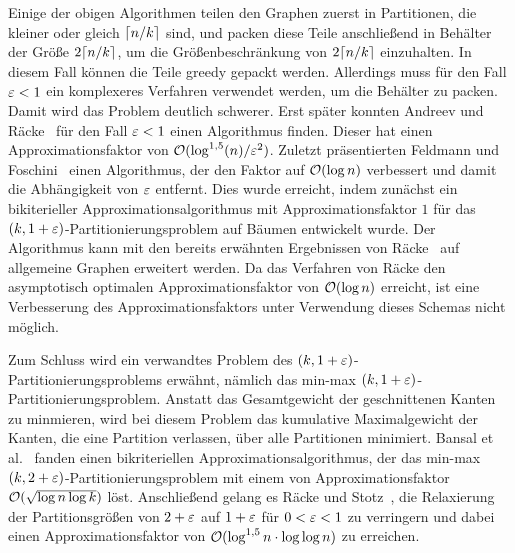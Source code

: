 Einige der obigen Algorithmen teilen den Graphen zuerst in Partitionen, die kleiner oder gleich $\lceil n/k\rceil$ sind, und packen diese Teile anschließend in Behälter der Größe $2 \lceil n/k\rceil$, um die Größenbeschränkung von $2 \lceil n/k\rceil$ einzuhalten.
In diesem Fall können die Teile greedy gepackt werden.
Allerdings muss für den Fall $\varepsilon < 1$ ein komplexeres Verfahren verwendet werden, um die Behälter zu packen. 
Damit wird das Problem deutlich schwerer.
Erst später konnten Andreev und Räcke~\cite{ar06} für den Fall $\varepsilon < 1$ einen Algorithmus finden.
Dieser hat einen Approximationsfaktor von $\mathcal{O}(\log^{1,5}(n)/\varepsilon^2)$.
Zuletzt präsentierten Feldmann und Foschini~\cite{FF15} einen Algorithmus, der den Faktor auf $\mathcal{O}(\log n)$ verbessert und damit die Abhängigkeit von $\varepsilon$ entfernt.
Dies wurde erreicht, indem zunächst ein bikiterieller Approximationsalgorithmus mit Approximationsfaktor $1$ für das $(k,1+\varepsilon)$\hyp Partitionierungsproblem auf Bäumen entwickelt wurde.
Der Algorithmus kann mit den bereits erwähnten Ergebnissen von Räcke~\cite{rc08} auf allgemeine Graphen erweitert werden.
Da das Verfahren von Räcke den asymptotisch optimalen Approximationsfaktor von $\mathcal{O}(\log n)$ erreicht, ist eine Verbesserung des Approximationsfaktors unter Verwendung dieses Schemas nicht möglich.

Zum Schluss wird ein verwandtes Problem des $(k, 1+\varepsilon)$\hyp Partitionierungsproblems erwähnt, nämlich das min-max $(k, 1+\varepsilon)$\hyp Partitionierungsproblem.
Anstatt das Gesamtgewicht der geschnittenen Kanten zu minmieren, wird bei diesem Problem das kumulative Maximalgewicht der Kanten, die eine Partition verlassen, über alle Partitionen minimiert.
Bansal et al.~\cite{BFK+11} fanden einen bikriteriellen Approximationsalgorithmus, der das min-max $(k, 2 + \varepsilon)$\hyp Partitionierungsproblem mit einem von Approximationsfaktor $\mathcal{O}(\sqrt{\log n \log k})$ löst.
Anschließend gelang es Räcke und Stotz~\cite{RS16}, die Relaxierung der Partitionsgrößen von $2 + \varepsilon$ auf $1 + \varepsilon$ für $0 < \varepsilon < 1$ zu verringern und dabei einen Approximationsfaktor von $\mathcal{O}(\log^{1,5} n \cdot \log \log n)$ zu erreichen.

